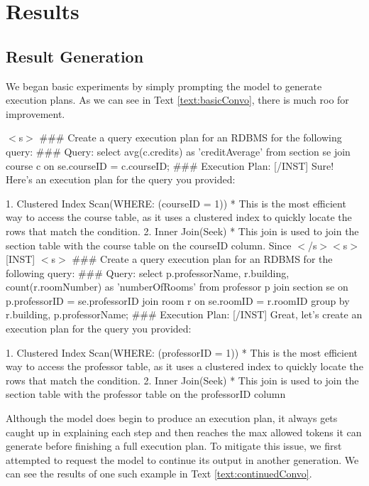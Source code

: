 \section{Results}
\subsection{Result Generation}
We began basic experiments by simply prompting the model to generate execution plans. As we can see in Text \ref{text:basicConvo}, there is much roo for improvement.

\begin{text}
  $<$s$>$ \#\#\# Create a query execution plan for an RDBMS for the following query: \#\#\# Query: select avg(c.credits) as 'creditAverage' from section se join course c on se.courseID = c.courseID; \#\#\# Execution Plan: [/INST]  Sure! Here's an execution plan for the query you provided:

  1. Clustered Index Scan(WHERE: (courseID = 1))
  * This is the most efficient way to access the course table, as it uses a clustered index to quickly locate the rows that match the condition.
  2. Inner Join(Seek)
  * This join is used to join the section table with the course table on the courseID column. Since $<$/s$>$$<$s$>$[INST] $<$s$>$ \#\#\# Create a query execution plan for an RDBMS for the following query: \#\#\# Query: select p.professorName, r.building, count(r.roomNumber) as 'numberOfRooms' from professor p join section se on p.professorID = se.professorID join room r on se.roomID = r.roomID group by r.building, p.professorName; \#\#\# Execution Plan: [/INST]  Great, let's create an execution plan for the query you provided:

  1. Clustered Index Scan(WHERE: (professorID = 1))
  * This is the most efficient way to access the professor table, as it uses a clustered index to quickly locate the rows that match the condition.
  2. Inner Join(Seek)
  * This join is used to join the section table with the professor table on the professorID column
  \caption{One of the earliest experiment's outputs}
  \label{text:basicConvo}
\end{text}

Although the model does begin to produce an execution plan, it always gets caught up in explaining each step and then reaches the max allowed tokens it can generate before finishing a full execution plan. To mitigate this issue, we first attempted to request the model to continue its output in another generation. We can see the results of one such example in Text \ref{text:continuedConvo}.

